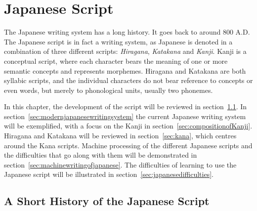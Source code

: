 
\chapter{Japanese Script}
\label{chap:japanasescript}


The Japanese writing system has a long history. It goes back to around 800 A.D. 
The Japanese script is in fact a writing system, as Japanese is denoted in 
a combination of three different scripts: \emph{Hiragana}, \emph{Katakana} and 
\emph{Kanji}. Kanji is a conceptual script, where each character bears the 
meaning of one or more semantic concepts and represents morphemes. 
Hiragana and Katakana are both syllabic scripts, and the individual characters do
not bear reference to concepts or even words, but merely to phonological units, 
usually two phonemes.

In this chapter, the development of the script will be reviewed in 
section~\ref{sec:ashorthistoryofjapanesewritingsystem}.
In section~\ref{sec:modernjapanesewritingsystem} the current Japanese writing 
system will be exemplified, with a focus on the Kanji in 
section~\ref{sec:compositionofKanji}. Hiragana and Katakana will be reviewed in
section~\ref{sec:kana}, which centres around the Kana scripts. 
Machine processing of the different Japanese scripts and the difficulties that
go along with them will be demonstrated in 
section~\ref{sec:machinewritingofjapanese}.
The difficulties of learning to use the Japanese script will be illustrated in 
section~\ref{sec:japanesedifficulties}.

\section{A Short History of the Japanese Script}
\label{sec:ashorthistoryofjapanesewritingsystem}

